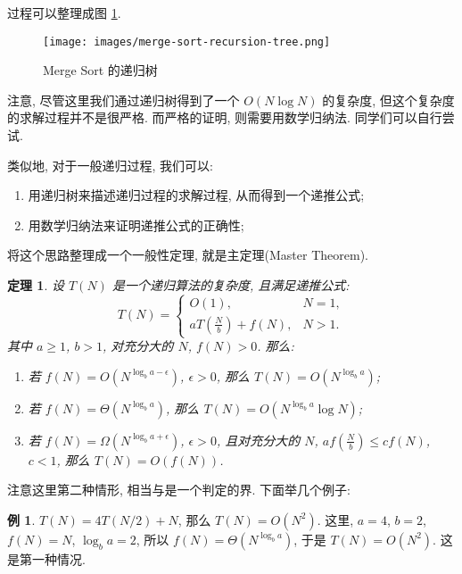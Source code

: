 \documentclass[a4paper]{ctexart}
\newtheorem{theorem}{定理}
\theoremstyle{definition}
\theoremstyle{definition}
\newtheorem{example}{例}[section]
\begin{document}
过程可以整理成图 \ref{fig:merge-sort-recursion-tree}.

\begin{figure}[htbp]
  \centering
  \texttt{[image: images/merge-sort-recursion-tree.png]}
  \caption{Merge Sort 的递归树}
  \label{fig:merge-sort-recursion-tree}
\end{figure}

注意, 尽管这里我们通过递归树得到了一个 $O(N \log N)$ 的复杂度, 但这个复杂度的求解过程并不是很严格.
而严格的证明, 则需要用数学归纳法. 同学们可以自行尝试.

类似地, 对于一般递归过程, 我们可以:
\begin{enumerate}
  \item 用递归树来描述递归过程的求解过程, 从而得到一个递推公式;
  \item 用数学归纳法来证明递推公式的正确性;
\end{enumerate}
将这个思路整理成一个一般性定理, 就是主定理(Master Theorem).

\begin{theorem}
  设 $T(N)$ 是一个递归算法的复杂度, 且满足递推公式:
  \begin{equation}
    T(N) = \left\{
      \begin{array}{ll}
        O(1), & N = 1, \\
        a T(\frac{N}{b}) + f(N), & N > 1.
      \end{array}
    \right.
  \end{equation}
  其中 $a \geq 1$, $b > 1$, 对充分大的 $N$, $f(N) > 0$. 那么:
  \begin{enumerate}
    \item 若 $f(N) = O(N^{\log_b a - \epsilon})$, $\epsilon > 0$, 那么 $T(N) = O(N^{\log_b a})$;
    \item 若 $f(N) = \Theta(N^{\log_b a})$, 那么 $T(N) = O(N^{\log_b a} \log N)$;
    \item 若 $f(N) = \Omega(N^{\log_b a + \epsilon})$, $\epsilon > 0$, 且对充分大的 $N$, $a f(\frac{N}{b}) \leq c f(N)$, $c < 1$, 那么 $T(N) = O(f(N))$.
  \end{enumerate}
\end{theorem}

注意这里第二种情形, 相当与是一个判定的界. 下面举几个例子:

\begin{example}
$T(N) = 4 T(N / 2) + N$, 那么 $T(N) = O(N^2)$.
这里, $a = 4$, $b = 2$, $f(N) = N$, $\log_b a = 2$, 所以 $f(N) = \Theta(N^{\log_b a})$, 于是 $T(N) = O(N^2)$. 这是第一种情况. 
\end{example}
\end{document}
